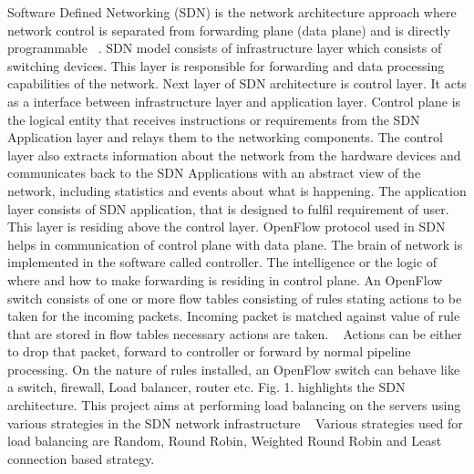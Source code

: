 \documentclass[letterpaper, 10 pt, conference]{IEEEtran}
\begin{document}
Software Defined Networking (SDN) is the network architecture approach where network control is separated from forwarding plane (data plane) and is directly programmable ~\cite{c1}. SDN model consists of infrastructure layer which consists of switching devices. This layer is responsible for forwarding and data processing capabilities of the network. Next layer of SDN architecture is control layer. It acts as a interface between infrastructure layer and application layer.  Control plane is the logical entity that receives instructions or requirements from the SDN Application layer and relays them to the networking components. The control layer also extracts information about the network from the hardware devices and communicates back to the SDN Applications with an abstract view of the network, including statistics and events about what is happening. The application layer consists of SDN application, that is designed to fulfil requirement of user. This layer is residing above the control layer. OpenFlow protocol used in SDN helps in communication of control plane with data plane. The brain of network is implemented in the software called controller. The intelligence or the logic of where and how to make forwarding is residing in control plane. An OpenFlow switch consists of one or more flow tables consisting of rules stating actions to be taken for the incoming packets. Incoming packet is matched against value of rule that are stored in flow tables necessary actions are taken. ~\cite{c4} Actions can be either to drop that packet, forward to controller or forward by normal pipeline processing. On the nature of rules installed, an OpenFlow switch can behave like a switch, firewall, Load balancer, router etc. Fig. 1. highlights the SDN architecture. This project aims at performing load balancing on the servers using various strategies in the SDN network infrastructure ~\cite{c2} Various strategies used for load balancing are Random, Round Robin, Weighted Round Robin and Least connection based strategy. 
\end{document}
